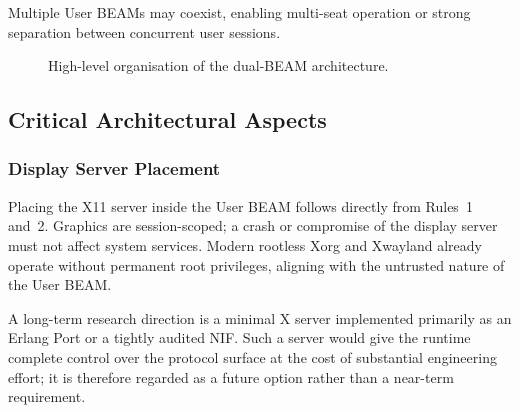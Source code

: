 \documentclass{article}
\begin{document}
Multiple User BEAMs may coexist, enabling multi-seat operation or strong separation between concurrent user sessions.

\begin{figure}[ht]
\centering
{}
\caption{High-level organisation of the dual-BEAM architecture.}
\label{fig:overview}
\end{figure}

\subsection{Critical Architectural Aspects}

\subsubsection{Display Server Placement}

Placing the X11 server inside the User BEAM follows directly from Rules~1 and~2.
Graphics are session-scoped; a crash or compromise of the display server must not affect system services.
Modern rootless Xorg and Xwayland already operate without permanent root privileges, aligning with the untrusted nature of the User BEAM.

A long-term research direction is a minimal X server implemented primarily as an Erlang Port or a tightly audited NIF.
Such a server would give the runtime complete control over the protocol surface at the cost of substantial engineering effort; it is therefore regarded as a future option rather than a near-term requirement.
\end{document}
